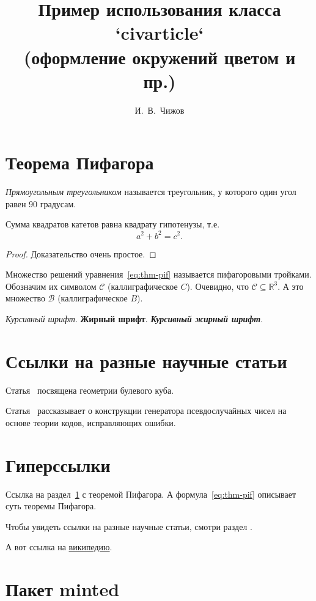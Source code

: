 \documentclass{../civarticle}
\title{
    Пример использования класса `civarticle`\\
    \small{(оформление окружений цветом и пр.)}
}
\author{И.~В.~Чижов}
\begin{document}
    \section{Теорема Пифагора}
    \label{sec:thm-pif}
    \begin{definition}
        \label{def:triangle}
        \emph{Прямоугольным треугольником} называется треугольник, у которого один угол равен 90 градусам.
    \end{definition}
    \begin{theorem}
        Сумма квадратов катетов равна квадрату гипотенузы, т.е.
        \begin{equation}
            \label{eq:thm-pif}
            a^2+b^2=c^2.
        \end{equation}
    \end{theorem}
    \begin{proof}
        Доказательство очень простое.
    \end{proof}
    Множество решений уравнения~\eqref{eq:thm-pif} называется пифагоровыми тройками.
    Обозначим их символом $\mathcal{C}$ (каллиграфическое $C$).
    Очевидно, что $\mathcal{C}\subseteq \mathbb{R}^{3}$.
    А это множество $\mathcal{B}$ (каллиграфическое $B$).

    \textit{Курсивный шрифт}.
    \textbf{Жирный шрифт}.
    \textit{\textbf{Курсивный жирный шрифт}}.

    \blindmathtrue
    \Blindtext[11][1]


    \section{Ссылки на разные научные статьи}
    \label{sec:ref-to-articles}

    Статья~\cite{ahlswede1977} посвящена геометрии булевого куба.

    Статья~\cite{ahmed2013} рассказывает о конструкции генератора псевдослучайных чисел на основе теории кодов, исправляющих ошибки.


    \section{Гиперссылки}
    \label{sec:hyper}

    Ссылка на раздел~\ref{sec:thm-pif} с теоремой Пифагора.
    А формула~\eqref{eq:thm-pif} описывает суть теоремы Пифагора.

    Чтобы увидеть ссылки на разные научные статьи, смотри раздел \hyperref[sec:ref-to-articles]{}.

    А вот ссылка на \href{https://ru.wikipedia.org}{википедию}.


    \section{Пакет minted}
    \label{sec:minted}
    \if \MINTED\empty
    \else
        \inputminted{python}{code.py}
    \fi
\end{document}
